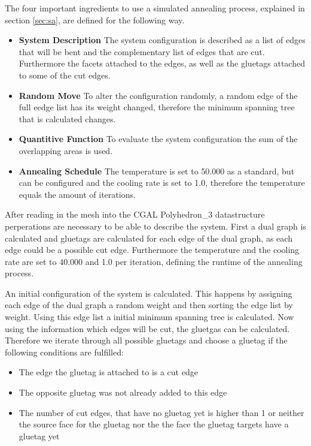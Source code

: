\documentclass[draft,final]{vutinfth} %
\begin{document}
The four important ingredients to use a simulated annealing process, explained in section \ref{sec:sa}, are defined for the following way.
\begin{itemize}
	\item \textbf{System Description} The system configuration is described as a list of edges that will be bent and the complementary list of edges that are cut. Furthermore the facets attached to the edges, as well as the gluetags attached to some of the cut edges.
	\item \textbf{Random Move} To alter the configuration randomly, a random edge of the full eedge list has its weight changed, therefore the minimum spanning tree that is calculated changes.
	\item \textbf{Quantitive Function} To evaluate the system configuration the sum of the overlapping areas is used.
	\item \textbf{Annealing Schedule} The temperature is set to 50.000 as a standard, but can be configured and the cooling rate is set to 1.0, therefore the temperature equals the amount of iterations.
\end{itemize}

After reading in the mesh into the CGAL Polyhedron\_3 datastructure perperations are necessary to be able to describe the system. First a dual graph is calculated and gluetags are calculated for each edge of the dual graph, as each edge could be a possible cut edge. Furthermore the temperature and the cooling rate are set to 40.000 and 1.0 per iteration, defining the runtime of the annealing process.

An initial configuration of the system is calculated. This happens by assigning each edge of the dual graph a random weight and then sorting the edge list by weight. Using this edge list a initial minimum spanning tree is calculated. Now using the information which edges will be cut, the gluetgas can be calculated. Therefore we iterate through all possible gluetags and choose a gluetag if the following conditions are fulfilled:

\begin{itemize}
	\item The edge the gluetag is attached to is a cut edge
	\item The opposite gluetag was not already added to this edge
	\item The number of cut edges, that have no gluetag yet is higher than 1 or neither the source face for the gluetag nor the the face the gluetag targets have a gluetag yet
\end{itemize}
\end{document}
